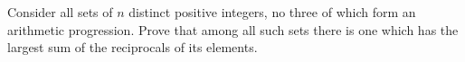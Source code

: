 Consider all sets of $n$ distinct positive integers, no three of which form an arithmetic progression. Prove that among all such sets there is one which has the largest sum of the reciprocals of its elements.